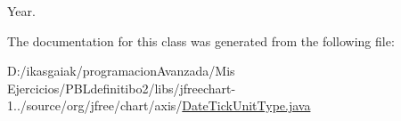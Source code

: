 Year. 

The documentation for this class was generated from the following file\+:\begin{DoxyCompactItemize}
\item 
D\+:/ikasgaiak/programacion\+Avanzada/\+Mis Ejercicios/\+P\+B\+Ldefinitibo2/libs/jfreechart-\/1../source/org/jfree/chart/axis/\mbox{\hyperlink{_date_tick_unit_type_8java}{Date\+Tick\+Unit\+Type.\+java}}\end{DoxyCompactItemize}
